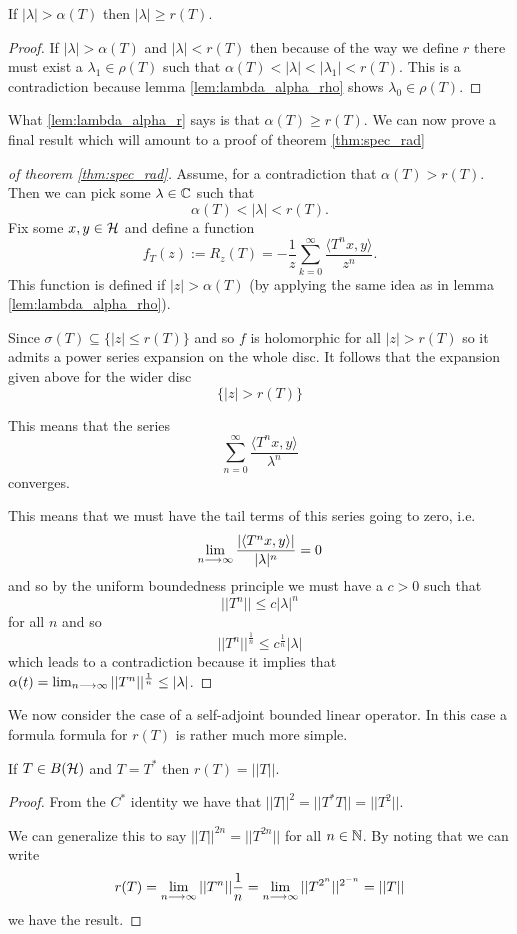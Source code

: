 \documentclass{unswmaths}
\begin{document}
\begin{lemma}
	\label{lem:lambda_alpha_r}
	If $ |\lambda| > \alpha(T) $ then $ |\lambda| \geq r(T) $.
\end{lemma}
\begin{proof}
	If $ |\lambda| > \alpha(T) $ and $ |\lambda| < r(T) $ then because of the way we define $ r $ there must exist a $ \lambda_1 \in \rho(T) $ such that
	$ \alpha(T) < |\lambda| < |\lambda_1| < r(T) $. This is a contradiction because lemma \ref{lem:lambda_alpha_rho} shows
	$ \lambda_0 \in \rho(T) $.
\end{proof}

What \ref{lem:lambda_alpha_r} says is that $ \alpha(T) \geq r(T) $.
We can now prove a final result which will amount to a proof of theorem \ref{thm:spec_rad}

\begin{proof}[of theorem \ref{thm:spec_rad}]
Assume, for a contradiction that $ \alpha(T) > r(T) $. Then we can pick some $ \lambda \in \mathbb{C} $ such that 
$$
	\alpha(T) < |\lambda| < r(T).
$$
Fix some $ x, y \in \mathcal{H} $ and define a function
$$
	f_T(z) := R_z(T) = -\frac{1}{z} \sum_{k=0}^\infty \frac{\langle T^n x, y \rangle}{z^n}.
$$
This function is defined if $ |z| > \alpha(T) $ (by applying the same idea as in lemma \ref{lem:lambda_alpha_rho}).

Since $ \sigma(T) \subseteq \{ |z| \leq r(T) \} $ and so $ f $ is holomorphic for all $ |z| > r(T) $ so
it admits a power series expansion on the whole disc. It follows that the expansion given above for the wider disc
$$ \{ |z| > r(T) \} $$

This means that the series 
$$
	\sum_{n=0}^\infty \frac{\langle T^n x, y \rangle}{\lambda^n}
$$
converges.

This means that we must have the tail terms of this series going to zero, i.e.
$$
	\lim_{n \longrightarrow \infty} \frac{|\langle T^n x, y \rangle|}{|\lambda|^n} = 0
$$
and so by the uniform boundedness principle we must have a $ c > 0 $ such that
$$
	||T^n|| \leq c|\lambda|^n
$$
for all $ n $ and so
$$
	||T^n||^\frac{1}{n} \leq c^\frac{1}{n} |\lambda|
$$
which leads to a contradiction because it implies that $ \alpha(t) = \lim_{n \longrightarrow \infty} ||T^n||^\frac{1}{n} \leq |\lambda| $.
\end{proof}

We now consider the case of a self-adjoint bounded linear operator. In this case a formula formula for $ r(T) $
is rather much more simple.
\begin{lemma}
	If $ T \in B(\mathcal{H}) $ and $ T = T^* $ then $ r(T) = ||T|| $.
\end{lemma}
\begin{proof}
	From the $C^*$ identity we have that $ ||T||^2 = ||T^*T|| = ||T^2|| $.
	
	We can generalize this to say $ ||T||^{2n} = ||T^{2n}|| $ for all $ n \in \mathbb{N} $.
	By noting that we can write
	$$
		r(T) = \lim_{n \longrightarrow \infty} ||T^n||\frac{1}{n} = \lim_{n \longrightarrow \infty}||T^{2^n}||^{2^{-n}} = ||T||
	$$
	we have the result.
\end{proof}
\end{document}
